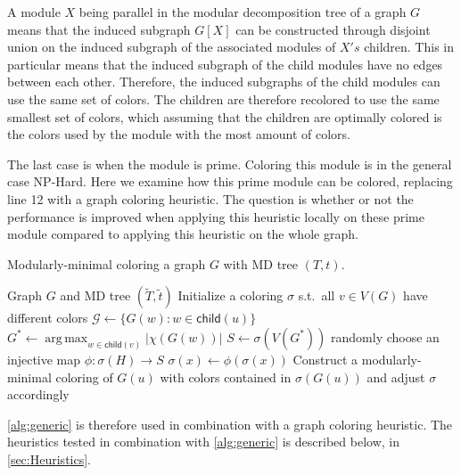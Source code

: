 \documentclass[a4paper]{article}
\newcommand{\child}{\mathsf{child}}
\DeclareMathOperator*{\argmax}{arg\,max}
\newcommand{\T}{\widetilde{T}}
\renewcommand{\t}{\widetilde{t}}
\begin{document}
A module $X$ being parallel in the modular decomposition tree of a graph $G$ means that
the induced subgraph $G[X]$ can be constructed through disjoint union on the induced
subgraph of the associated modules of $X's$ children. This in particular means that 
the induced subgraph of the child modules have no edges between each other. Therefore,
the induced subgraphs of the child modules can use the same set of colors. The children
are therefore recolored to use the same smallest set of colors, 
which assuming that the children are optimally colored is the colors used by the module 
with the most amount of colors.

The last case is when the module is prime. Coloring this module is in the
general case NP-Hard. Here we examine how this prime module can be colored,
replacing line 12 with a graph coloring heuristic. The question is whether or
not the performance is improved when applying this heuristic locally on these
prime module compared to applying this heuristic on the whole graph.

\begin{algorithm}[H]
  \caption{Modularly-minimal coloring a graph $G$ with MD tree $(T,t)$.}
  \label{alg:generic}
  \begin{algorithmic}[1]
    \REQUIRE Graph $G$ and MD tree $(\T,\t)$
    \STATE Initialize a coloring $\sigma$ s.t.\ all $v \in V(G)$
           have different colors
          \STATE $\mathcal{G} \leftarrow \{G(w)\colon w\in\child(u)\}$ 
          \STATE $G^* \leftarrow \argmax_{w\in\child(v)} |\chi(G(w))|$
          \STATE $S \leftarrow \sigma(V(G^*))$ 
             \STATE randomly choose an injective map $\phi:\sigma(H)\to S$
                \STATE $\sigma(x)\leftarrow \phi(\sigma(x))$  
             \ENDFOR
          \ENDFOR
          \STATE Construct a modularly-minimal coloring of $G(u)$
              with colors contained in $\sigma(G(u))$
              and adjust $\sigma$ accordingly 
       \ENDIF
    \ENDFOR
  \end{algorithmic}
\end{algorithm}

\autoref{alg:generic} is therefore used in combination with a graph coloring
heuristic. The heuristics tested in combination with \autoref{alg:generic} is
described below, in \autoref{sec:Heuristics}.
\end{document}
